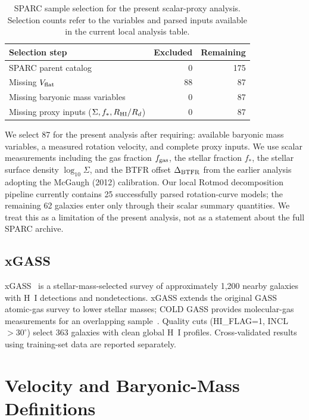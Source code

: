 \documentclass[11pt]{article}
\begin{document}
\begin{table}[H]
\centering
\caption{SPARC sample selection for the present scalar-proxy analysis. Selection counts refer to the variables and parsed inputs available in the current local analysis table.}
\label{tab:sparc_selection}
\begin{tabular}{lrr}
\toprule
Selection step & Excluded & Remaining \\
\midrule
SPARC parent catalog & 0 & 175 \\
Missing $V_{\rm flat}$ & 88 & 87 \\
Missing baryonic mass variables & 0 & 87 \\
Missing proxy inputs ($\Sigma, f_*, R_{\rm HI}/R_d$) & 0 & 87 \\
\bottomrule
\end{tabular}
\end{table}

We select 87 for the present analysis after requiring: available baryonic mass variables, a measured rotation velocity, and complete proxy inputs. We use scalar measurements including the gas fraction $f_{\rm gas}$, the stellar fraction $f_*$, the stellar surface density $\log_{10}\Sigma$, and the BTFR offset $\Delta_{\rm BTFR}$ from the earlier analysis adopting the McGaugh (2012) calibration. Our local Rotmod decomposition pipeline currently contains 25 successfully parsed rotation-curve models; the remaining 62 galaxies enter only through their scalar summary quantities. We treat this as a limitation of the present analysis, not as a statement about the full SPARC archive.

\subsection{xGASS}

xGASS~\cite{catinella2018} is a stellar-mass-selected survey of approximately 1,200 nearby galaxies with H~I detections and nondetections. xGASS extends the original GASS atomic-gas survey to lower stellar masses; COLD GASS provides molecular-gas measurements for an overlapping sample~\cite{saintonge2011}. Quality cuts (HI\_FLAG=1, INCL $>30^\circ$) select 363 galaxies with clean global H~I profiles. Cross-validated results using training-set data are reported separately.

\section{Velocity and Baryonic-Mass Definitions}
\end{document}
